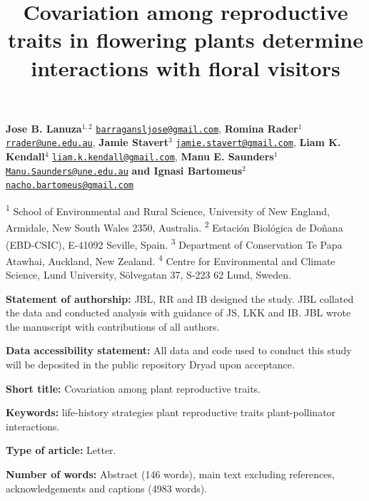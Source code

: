 \documentclass[
  12pt,
  a4paper,
]{article}
\title{\singlespacing \vspace{-1.6cm} \LARGE Covariation among reproductive traits in flowering plants determine interactions with floral visitors}
\author{}
\date{\vspace{-2.5em}}
\begin{document}
\maketitle

\vspace{-1.4cm}

\singlespacing

\textbf{Jose B. Lanuza$^{1,2}$} \href{mailto:barragansljose@gmail.com}{\nolinkurl{barragansljose@gmail.com}}, \textbf{Romina Rader$^{1}$} \href{mailto:rrader@une.edu.au}{\nolinkurl{rrader@une.edu.au}}, \textbf{Jamie Stavert$^{3}$} \href{mailto:jamie.stavert@gmail.com}{\nolinkurl{jamie.stavert@gmail.com}}, \textbf{Liam K. Kendall$^{4}$} \href{mailto:liam.k.kendall@gmail.com}{\nolinkurl{liam.k.kendall@gmail.com}}, \textbf{Manu E. Saunders$^{1}$} \href{mailto:Manu.Saunders@une.edu.au}{\nolinkurl{Manu.Saunders@une.edu.au}} \textbf{and Ignasi Bartomeus$^{2}$} \href{mailto:nacho.bartomeus@gmail.com}{\nolinkurl{nacho.bartomeus@gmail.com}}

\small

\textsuperscript{1} School of Environmental and Rural Science, University of New England, Armidale, New South Wales 2350, Australia. \textsuperscript{2} Estación Biológica de Doñana (EBD-CSIC), E-41092 Seville, Spain. \textsuperscript{3} Department of Conservation \textbar{} Te Papa Atawhai, Auckland, New Zealand. \textsuperscript{4} Centre for Environmental and Climate Science, Lund University, Sölvegatan 37, S-223 62 Lund, Sweden.

\doublespacing
\normalsize

\textbf{Statement of authorship:} JBL, RR and IB designed the study. JBL collated the data and conducted analysis with guidance of JS, LKK and IB. JBL wrote the manuscript with contributions of all authors.

\textbf{Data accessibility statement:} All data and code used to conduct this study will be deposited in the public repository Dryad upon acceptance.

\textbf{Short title:} Covariation among plant reproductive traits.

\textbf{Keywords:} life-history strategies \textbar{} plant reproductive traits \textbar{} plant-pollinator interactions.

\textbf{Type of article:} Letter.

\textbf{Number of words:} Abstract (146 words), main text excluding references, acknowledgements and captions (4983 words).
\end{document}
